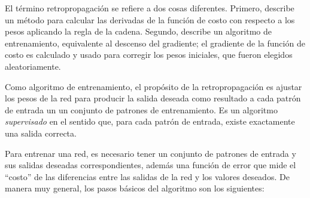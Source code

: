 



El término retropropagación se refiere a dos cosas diferentes. Primero,
describe un método para calcular las derivadas de la función de costo con respecto
a los pesos aplicando la regla de la cadena. Segundo, describe un algoritmo
de entrenamiento, equivalente al descenso del gradiente; el gradiente de la función
de costo es calculado y usado para corregir los pesos iniciales, que fueron 
elegidos aleatoriamente.

Como algoritmo de entrenamiento, el propósito de la retropropagación es ajustar
los pesos de la red para producir la salida deseada como resultado 
a cada patrón de entrada un un conjunto de patrones de entrenamiento.
Es un algoritmo \textit{supervisado} en el sentido que, para cada
patrón de entrada, existe exactamente una salida correcta.

Para entrenar una red, es necesario tener un conjunto de patrones de
entrada y sus salidas deseadas correspondientes, además una función
de error que mide el ``costo'' de las diferencias entre las salidas 
de la red y los valores deseados. De manera muy general,
los pasos básicos del algoritmo son los siguientes:

